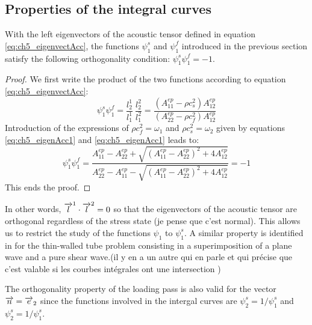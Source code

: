 \subsection{Properties of the integral curves}
With the left eigenvectors of the acoustic tensor defined in equation \eqref{eq:ch5_eigenvectAcc}, the functions $\psi^s_1$ and $\psi^f_1$ introduced in the previous section satisfy the following orthogonality condition: $\psi^s_1\psi^f_1=-1$. 

\begin{proof}
  We first write the product of the two functions according to equation \eqref{eq:ch5_eigenvectAcc}:
  \begin{equation*}
    \psi^s_1\psi^f_1 = \frac{l^1_2}{l^1_1}\: \frac{l_2^2}{l^2_1} = \frac{(A_{11}^{ep}-\rho c_s^2)A^{ep}_{12}}{(A_{22}^{ep}-\rho c_f^2)A^{ep}_{12}}
  \end{equation*}
  Introduction of the expressions of $\rho c_f^2 = \omega_1$ and $\rho c_s^2 = \omega_2$ given by equations \eqref{eq:ch5_eigenAcc1} and \eqref{eq:ch5_eigenAcc1} leads to:
  \begin{equation*}
    \psi^s_1\psi^f_1 = \frac{A_{11}^{ep}-A_{22}^{ep}+\sqrt{(A_{11}^{ep}-A_{22}^{ep})^2 + 4A_{12}^{ep}}}{A_{22}^{ep}-A_{11}^{ep}-\sqrt{(A_{11}^{ep}-A_{22}^{ep})^2 + 4A_{12}^{ep}}}=-1
  \end{equation*}
  This ends the proof.
\end{proof}
In other words, ${\overrightarrow{l}}^1 \cdot {\overrightarrow{l}}^2=0$ so that the eigenvectors of the acoustic tensor are orthogonal regardless of the stress state (je pense que c'est normal). This allows us to restrict the study of the functions $\psi_1$ to $\psi^s_1$.
A similar property is identified in \cite{Clifton} for the thin-walled tube problem consisting in a superimposition of a plane wave and a pure shear wave.(il y en a un autre qui en parle et qui précise que c'est valable si les courbes intégrales ont une intersection \cite[p.13]{Ting68})
\begin{remark}
  The orthogonality property of the loading pass is also valid for the vector ${\overrightarrow{n}}={\overrightarrow{e}}_2$ since the functions involved in the intergal curves are $\psi^s_2=1/\psi^s_1$ and $\psi^s_2=1/\psi^s_1$.
\end{remark}

